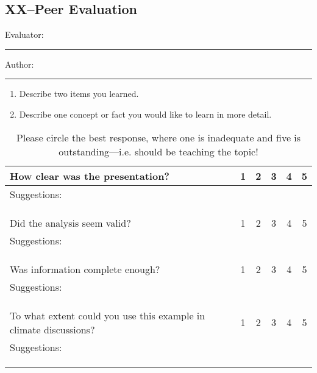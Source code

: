 \documentclass{article}\usepackage[]{graphicx}\usepackage[]{color}
\begin{document}
\clearpage
\newpage
\subsection{XX--Peer Evaluation}

\bigskip
Evaluator: \rule{7cm}{0.4pt}

\bigskip

\noindent Author: \rule{7cm}{0.4pt}

\begin{enumerate}
 \setlength\itemsep{4em}
  \item Describe two items you learned.
  \item Describe one concept or fact you would like to learn in more detail.
\end{enumerate}


\begin{table}[ht!]
\caption{Please circle the best response, where one is inadequate and five is outstanding---i.e. should be teaching the topic!}
\begin{tabular}{|p{4in}|ccccc|}\hline
How clear was the presentation?     & 1 & 2 & 3 & 4 & 5 \\ \hline
Suggestions: &&&&& \\ &&&&& \\ &&&&& \\
&&&&& \\ \hline
Did the analysis seem valid?        & 1 & 2 & 3 & 4 & 5 \\ \hline
Suggestions: &&&&& \\ &&&&& \\ &&&&& \\
&&&&& \\ \hline
Was information complete enough?            & 1 & 2 & 3 & 4 & 5 \\ \hline
Suggestions: &&&&& \\ &&&&& \\ &&&&& \\
&&&&& \\ \hline
To what extent could you use this example in climate discussions?            & 1 & 2 & 3 & 4 & 5 \\ \hline
Suggestions: &&&&& \\ &&&&& \\ &&&&& \\
&&&&& \\ \hline
\end{tabular}
\end{table}

\clearpage
\newpage
\end{document}
